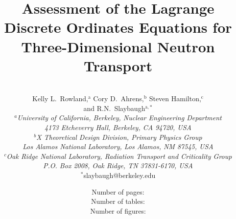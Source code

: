 \documentclass{article} %
\begin{document}

\title{Assessment of the Lagrange Discrete Ordinates Equations for
Three-Dimensional Neutron Transport} %

\author{
\vspace{20mm}
\\Kelly L.\ Rowland,$^{\text{a}}$  Cory D.\ Ahrens,$^\text{b}$ Steven Hamilton,$^\text{c}$ 
\\and R.N.\ Slaybaugh$^{\text{a},\ast}$\\[4pt] 
\textit{$^a$University of California, Berkeley, Nuclear Engineering Department}\\[-10pt]
\textit{4173 Etcheverry Hall, Berkeley, CA 94720, USA} \\[-5pt]
\textit{$^b$X Theoretical Design Division, Primary Physics Group}\\[-10pt]
\textit{Los Alamos National Laboratory, Los Alamos, NM 87545, USA}\\[-5pt]
\textit{$^c$Oak Ridge National Laboratory, Radiation Transport and Criticality Group} \\ [-10pt]
\textit{P.O. Box 2008, Oak Ridge, TN 37831-6170, USA} \\ [-2pt]
{$^\ast$slaybaugh@berkeley.edu}} %

\date{
\vspace{40mm}
Number of pages: \pageref{LastPage} \\  
Number of tables: \totaltables \\
Number of figures: \totalfigures \\}                                              

\maketitle

\pagebreak
\end{document}
